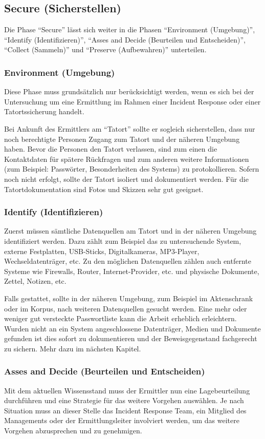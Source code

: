 \subsection{Secure (Sicherstellen)}
Die Phase "`Secure"' lässt sich weiter in die Phasen "`Environment (Umgebung)"', "`Identify (Identifizieren)"', "`Asses and Decide (Beurteilen und Entscheiden)"', "`Collect (Sammeln)"' und "`Preserve (Aufbewahren)"' unterteilen.


\subsubsection{Environment (Umgebung)}
Diese Phase muss grundsätzlich nur berücksichtigt werden, wenn es sich bei der Untersuchung um eine Ermittlung im Rahmen einer Incident Response oder einer Tatortssicherung handelt.

Bei Ankunft des Ermittlers am "`Tatort"' sollte er sogleich sicherstellen, dass nur noch berechtigte Personen Zugang zum Tatort und der näheren Umgebung haben. Bevor die Personen den Tatort verlassen, sind zum einen die Kontaktdaten für spätere Rückfragen und zum anderen weitere Informationen (zum Beispiel: Passwörter, Besonderheiten des Systems) zu protokollieren. Sofern noch nicht erfolgt, sollte der Tatort isoliert und dokumentiert werden. Für die Tatortdokumentation sind Fotos und Skizzen sehr gut geeignet.

\subsubsection{Identify (Identifizieren)}
Zuerst müssen sämtliche Datenquellen am Tatort und in der näheren Umgebung identifiziert werden. Dazu zählt zum Beispiel das zu untersuchende System, externe Festplatten, USB-Sticks, Digitalkameras, MP3-Player, Wechseldatenträger, etc. Zu den möglichen Datenquellen zählen auch entfernte Systeme wie Firewalls, Router, Internet-Provider, etc. und physische Dokumente, Zettel, Notizen, etc. 

Falls gestattet, sollte in der näheren Umgebung, zum Beispiel im Aktenschrank oder im Korpus, nach weiteren Datenquellen gesucht werden. Eine mehr oder weniger gut versteckte Passwortliste kann die Arbeit erheblich erleichtern. Wurden nicht an ein System angeschlossene Datenträger, Medien  und Dokumente gefunden ist dies sofort zu dokumentieren und der Beweisgegenstand fachgerecht zu sichern. Mehr dazu im nächsten Kapitel.

\subsubsection{Asses and Decide (Beurteilen und Entscheiden)}
Mit dem aktuellen Wissensstand muss der Ermittler nun eine Lagebeurteilung durchführen und eine Strategie für das weitere Vorgehen auswählen. Je nach Situation muss an dieser Stelle das Incident Response Team, ein Mitglied des Managements oder der Ermittlungsleiter involviert werden, um das weitere Vorgehen abzusprechen und zu genehmigen.

